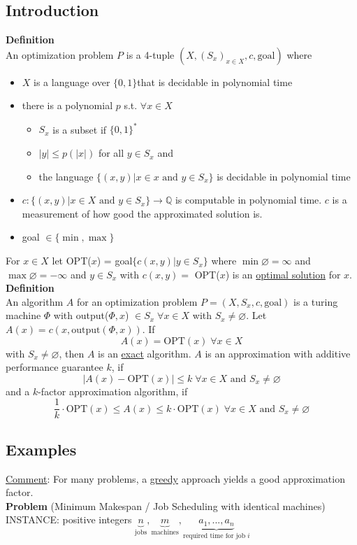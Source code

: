 \documentclass[a4paper, 12pt]{article}
\begin{document}
	\subsection{Introduction}
	\textbf{Definition}\\
	An optimization problem $P$ is a 4-tuple $(X, (S_x)_{x\in X}, c, \text{goal})$ where \begin{itemize}
		\item $X$ is a language over $\{0,1\}$that is decidable in polynomial time\item there is a polynomial $p$ s.t. $\forall x \in X$ \begin{itemize}
			\item $S_x$ is a subset if $\{0,1\}^*$
			\item $\left|y\right| \leq p(\left|x\right|)$ for all $y\in S_x$ and 
			\item the language $\{(x,y)| x \in x \text{ and } y\in S_x\}$ is decidable in polynomial time
		\end{itemize}
	\item $c: \{(x,y)|x \in X \text{ and } y \in S_x\} \to \mathbb{Q}$ is computable in polynomial time. $c$ is a measurement of how good the approximated solution is.
	\item goal $\in \{\min, \max\}$
	\end{itemize}
	For $x \in X$ let OPT($x$) = goal$\{c(x,y)|y\in S_x\}$ where $\min \varnothing = \infty$ and $\max \varnothing = -\infty$ and $y \in S_x$ with $c(x,y) =$ OPT($x$) is an \underline{optimal solution} for $x$.\\
	\textbf{Definition}\\
	An algorithm $A$ for an optimization problem $P=(X,S_x,c,\text{goal})$ is a turing machine $\Phi$ with output($\Phi, x$) $\in S_x \; \forall x \in X$ with $S_x \neq \varnothing$. Let $A(x) = c(x,\text{output}(\Phi,x))$. If \[A(x) = \text{OPT}(x) \; \forall x \in X\] with $S_x \neq \varnothing$, then $A$ is an \underline{exact} algorithm. $A$ is an approximation with additive performance guarantee $k$, if \[\left|A(x) - \text{OPT}(x)\right| \leq k \; \forall x \in X \text{ and } S_x \neq \varnothing\] and a $k$-factor approximation algorithm, if \[\frac{1}{k}\cdot \text{OPT}(x) \leq A(x) \leq k\cdot\text{OPT}(x) \; \forall x \in X \text{ and } S_x \neq \varnothing\]
	\subsection{Examples}
	\underline{Comment}: For many problems, a \underline{greedy} approach yields a good approximation factor.\\
	\textbf{Problem} (Minimum Makespan / Job Scheduling with identical machines)\\
	INSTANCE: positive integers $\underbrace{n}_{\text{jobs}},\underbrace{m}_{\text{machines}},\underbrace{a_1,...,a_n}_{\text{required time for job $i$}}$\\
\end{document}
